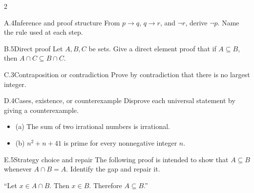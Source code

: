 \documentclass[9pt]{extarticle}
\begin{document}
\begin{multicols}{2}
\begin{CoreProblem}{A.4}{Inference and proof structure}
From $p\to q$, $q\to r$, and $\neg r$, derive $\neg p$. Name the rule used at
each step.
\end{CoreProblem}
\begin{CoreProblem}{B.5}{Direct proof}
Let $A,B,C$ be sets. Give a direct element proof that if $A\subseteq B$, then
$A\cap C\subseteq B\cap C$.
\end{CoreProblem}
\begin{CoreProblem}{C.3}{Contraposition or contradiction}
Prove by contradiction that there is no largest integer.
\end{CoreProblem}
\columnbreak
\begin{CoreProblem}{D.4}{Cases, existence, or counterexample}
Disprove each universal statement by giving a counterexample.
\begin{itemize}
  \item (a) The sum of two irrational numbers is irrational.
  \item (b) $n^2+n+41$ is prime for every nonnegative integer $n$.
\end{itemize}
\end{CoreProblem}
\begin{CoreProblem}{E.5}{Strategy choice and repair}
The following proof is intended to show that $A\subseteq B$ whenever
$A\cap B=A$. Identify the gap and repair it.

``Let $x\in A\cap B$. Then $x\in B$. Therefore $A\subseteq B$.''
\end{CoreProblem}
\end{multicols}
\CoreWorkArea
\FormBreak
{}
\end{document}
